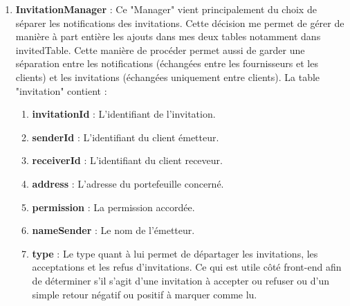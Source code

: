 \begin{enumerate}
\item \textbf{InvitationManager} :\newline
Ce "Manager" vient principalement du choix de séparer les notifications des invitations. \newline
Cette décision me permet de gérer de manière à part entière les ajouts dans mes deux tables notamment dans invitedTable.\newline
Cette manière de procéder permet aussi de garder une séparation entre les notifications (échangées entre les fournisseurs et les clients) et les invitations (échangées uniquement entre clients).\newline
La table "invitation" contient :
\begin{enumerate}[-]
\item \textbf{invitationId} :\newline
L'identifiant de l'invitation.
\item \textbf{senderId} :\newline
L'identifiant du client émetteur.
\item \textbf{receiverId} :\newline
L'identifiant du client receveur.
\item \textbf{address} :\newline
L'adresse du portefeuille concerné.
\item \textbf{permission} :\newline
La permission accordée.
\item \textbf{nameSender} :\newline
Le nom de l'émetteur.
\item \textbf{type} :\newline
Le type quant à lui permet de départager les invitations, les acceptations et les refus d'invitations.
Ce qui est utile côté front-end afin de déterminer s'il s'agit d'une invitation à accepter ou refuser ou d'un simple retour négatif ou positif à marquer comme lu.
\end{enumerate}


\end{enumerate}
